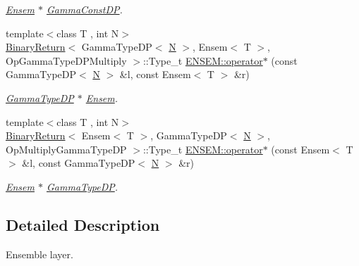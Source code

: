 \begin{DoxyCompactItemize}
\begin{DoxyCompactList}\small\item\em \mbox{\hyperlink{classENSEM_1_1Ensem}{Ensem}} $\ast$ \mbox{\hyperlink{classENSEM_1_1GammaConstDP}{Gamma\+Const\+DP}}. \end{DoxyCompactList}\item 
{\footnotesize template$<$class T , int N$>$ }\\\mbox{\hyperlink{structBinaryReturn}{Binary\+Return}}$<$ Gamma\+Type\+DP$<$ \mbox{\hyperlink{adat__devel_2lib_2hadron_2operator__name__util_8cc_a7722c8ecbb62d99aee7ce68b1752f337}{N}} $>$, Ensem$<$ T $>$, Op\+Gamma\+Type\+D\+P\+Multiply $>$\+::Type\+\_\+t \mbox{\hyperlink{group__eensem_ga53d61b0a5109e4f59f7b77a3fb4817f9}{E\+N\+S\+E\+M\+::operator$\ast$}} (const Gamma\+Type\+DP$<$ \mbox{\hyperlink{adat__devel_2lib_2hadron_2operator__name__util_8cc_a7722c8ecbb62d99aee7ce68b1752f337}{N}} $>$ \&l, const Ensem$<$ T $>$ \&r)
\begin{DoxyCompactList}\small\item\em \mbox{\hyperlink{classENSEM_1_1GammaTypeDP}{Gamma\+Type\+DP}} $\ast$ \mbox{\hyperlink{classENSEM_1_1Ensem}{Ensem}}. \end{DoxyCompactList}\item 
{\footnotesize template$<$class T , int N$>$ }\\\mbox{\hyperlink{structBinaryReturn}{Binary\+Return}}$<$ Ensem$<$ T $>$, Gamma\+Type\+DP$<$ \mbox{\hyperlink{adat__devel_2lib_2hadron_2operator__name__util_8cc_a7722c8ecbb62d99aee7ce68b1752f337}{N}} $>$, Op\+Multiply\+Gamma\+Type\+DP $>$\+::Type\+\_\+t \mbox{\hyperlink{group__eensem_ga28d880d590e554a96424952e16186000}{E\+N\+S\+E\+M\+::operator$\ast$}} (const Ensem$<$ T $>$ \&l, const Gamma\+Type\+DP$<$ \mbox{\hyperlink{adat__devel_2lib_2hadron_2operator__name__util_8cc_a7722c8ecbb62d99aee7ce68b1752f337}{N}} $>$ \&r)
\begin{DoxyCompactList}\small\item\em \mbox{\hyperlink{classENSEM_1_1Ensem}{Ensem}} $\ast$ \mbox{\hyperlink{classENSEM_1_1GammaTypeDP}{Gamma\+Type\+DP}}. \end{DoxyCompactList}\end{DoxyCompactItemize}


\subsection{Detailed Description}
Ensemble layer. 



